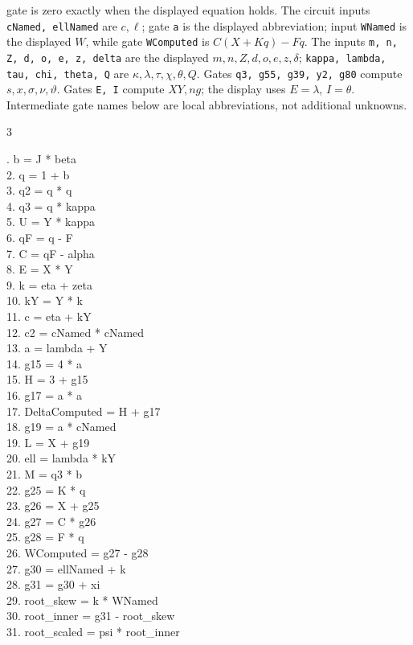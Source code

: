 \documentclass[10pt]{article}
\begin{document}
gate is zero exactly when the displayed equation holds. The circuit inputs
\texttt{cNamed, ellNamed} are $c,\ell$; gate \texttt{a} is the displayed abbreviation; input \texttt{WNamed} is the
displayed $W$, while gate \texttt{WComputed} is $C(X+Kq)-Fq$. The inputs
\texttt{m, n, Z, d, o, e, z, delta} are the displayed
$m,n,Z,d,o,e,z,\delta$; \texttt{kappa, lambda, tau, chi, theta, Q}
are $\kappa,\lambda,\tau,\chi,\theta,Q$. Gates \texttt{q3, g55, g39, y2, g80} compute $s,x,\sigma,\nu,\vartheta$. Gates \texttt{E, I} compute
$XY,ng$; the display uses $E=\lambda$, $I=\theta$. Intermediate gate
names below are local abbreviations, not additional unknowns.
\begin{multicols}{3}
\raggedright\ttfamily\fontsize{7.2}{8.4}. b = J * beta\\
2. q = 1 + b\\
3. q2 = q * q\\
4. q3 = q * kappa\\
5. U = Y * kappa\\
6. qF = q - F\\
7. C = qF - alpha\\
8. E = X * Y\\
9. k = eta + zeta\\
10. kY = Y * k\\
11. c = eta + kY\\
12. c2 = cNamed * cNamed\\
13. a = lambda + Y\\
14. g15 = 4 * a\\
15. H = 3 + g15\\
16. g17 = a * a\\
17. DeltaComputed = H + g17\\
18. g19 = a * cNamed\\
19. L = X + g19\\
20. ell = lambda * kY\\
21. M = q3 * b\\
22. g25 = K * q\\
23. g26 = X + g25\\
24. g27 = C * g26\\
25. g28 = F * q\\
26. WComputed = g27 - g28\\
27. g30 = ellNamed + k\\
28. g31 = g30 + xi\\
29. root\_skew = k * WNamed\\
30. root\_inner = g31 - root\_skew\\
31. root\_scaled = psi * root\_inner\\

\end{multicols}
\end{document}
